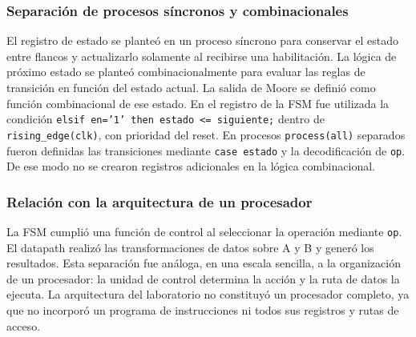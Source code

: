 \subsubsection{Separación de procesos síncronos y combinacionales}
El registro de estado se planteó en un proceso síncrono para conservar el estado entre flancos y actualizarlo solamente al recibirse una habilitación. La lógica de próximo estado se planteó combinacionalmente para evaluar las reglas de transición en función del estado actual. La salida de Moore se definió como función combinacional de ese estado. En el registro de la FSM fue utilizada la condición \texttt{elsif en='1' then estado <= siguiente;} dentro de \texttt{rising\_edge(clk)}, con prioridad del reset. En procesos \texttt{process(all)} separados fueron definidas las transiciones mediante \texttt{case estado} y la decodificación de \texttt{op}. De ese modo no se crearon registros adicionales en la lógica combinacional.

\subsubsection{Relación con la arquitectura de un procesador}
La FSM cumplió una función de control al seleccionar la operación mediante \texttt{op}. El datapath realizó las transformaciones de datos sobre A y B y generó los resultados. Esta separación fue análoga, en una escala sencilla, a la organización de un procesador: la unidad de control determina la acción y la ruta de datos la ejecuta. La arquitectura del laboratorio no constituyó un procesador completo, ya que no incorporó un programa de instrucciones ni todos sus registros y rutas de acceso.

